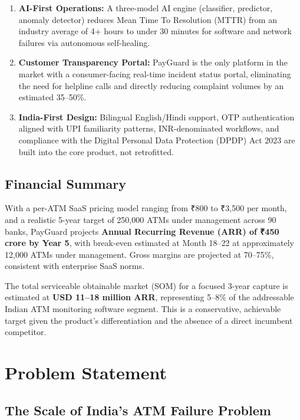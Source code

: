 \documentclass[12pt,a4paper]{article}
\newcommand{\inr}{₹}
\begin{document}
\begin{enumerate}
  \item \textbf{AI-First Operations:} A three-model AI engine (classifier, predictor, anomaly
        detector) reduces Mean Time To Resolution (MTTR) from an industry average of 4+ hours to
        under 30 minutes for software and network failures via autonomous self-healing.
  \item \textbf{Customer Transparency Portal:} PayGuard is the only platform in the market with a
        consumer-facing real-time incident status portal, eliminating the need for helpline calls
        and directly reducing complaint volumes by an estimated 35--50\%.
  \item \textbf{India-First Design:} Bilingual English/Hindi support, OTP authentication aligned
        with UPI familiarity patterns, INR-denominated workflows, and compliance with the Digital
        Personal Data Protection (DPDP) Act 2023 \citep{dpdp2023} are built into the core product,
        not retrofitted.
\end{enumerate}

\subsection*{Financial Summary}

With a per-ATM SaaS pricing model ranging from \inr{}800 to \inr{}3,500 per month, and a
realistic 5-year target of 250,000 ATMs under management across 90 banks, PayGuard projects
\textbf{Annual Recurring Revenue (ARR) of \inr{}450 crore by Year 5}, with break-even estimated
at Month 18--22 at approximately 12,000 ATMs under management. Gross margins are projected at
70--75\%, consistent with enterprise SaaS norms.

The total serviceable obtainable market (SOM) for a focused 3-year capture is estimated at
\textbf{USD 11--18 million ARR}, representing 5--8\% of the addressable Indian ATM monitoring
software segment. This is a conservative, achievable target given the product's differentiation
and the absence of a direct incumbent competitor.

\newpage

\section{Problem Statement}

\subsection{The Scale of India's ATM Failure Problem}
\end{document}
